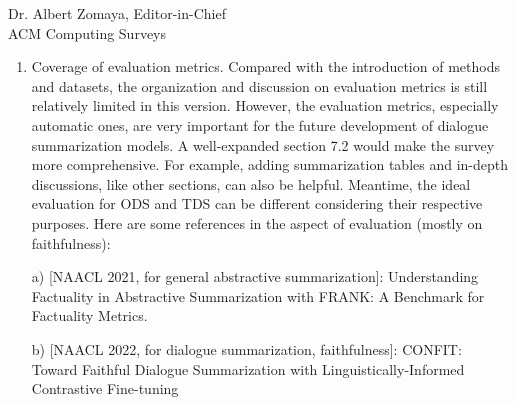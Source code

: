 \documentclass[11pt]{letter} %
\begin{document}
\begin{letter}{
Dr. Albert Zomaya, Editor-in-Chief  \\
ACM Computing Surveys}
\begin{enumerate}
\begin{itemize}
			\item Sec 8.2 Future Directions, Page 30 Line 20: ``We discuss some possible future directions and organize them into three dimensions: task scenarios, approaches and evaluations......Multi-session dialogue summarization is required when conversations occur multiple times among the same group of speakers. The Information mentioned in previous sessions becomes their consensus and may not be explained again in the current session.......Generalizable and non-labored techniques have attracted increasing attention on other dialogue modeling tasks......Compared with traditional dialogue summarization systems, LLM-based methods largely alleviate the tedious human labor and can be more generalizable due to the removal of unintended annotation artifacts. Nevertheless, approaches that are previously applied to small pre-trained language models in this survey may also provide inspirations and be adapted to augment LLMs for better dialogue summarization performance......Factual errors caused by the mismatch between speakers and events are common as a result of complicated discourse relations among utterances in dialogues......With the strong generation ability of current LLMs, there’s also a doubt that whether the previous taxonomy of error types and evaluation metrics is still suitable. In a word, both meta-evaluation benchmarks and evaluation methods call for innovations.''
		
		\end{itemize}
	
	
	\item Coverage of evaluation metrics. Compared with the introduction of methods and datasets, the organization and discussion on evaluation metrics is still relatively limited in this version. However, the evaluation metrics, especially automatic ones, are very important for the future development of dialogue summarization models. A well-expanded section 7.2 would make the survey more comprehensive. For example, adding summarization tables and in-depth discussions, like other sections, can also be helpful. Meantime, the ideal evaluation for ODS and TDS can be different considering their respective purposes. Here are some references in the aspect of evaluation (mostly on faithfulness):
	
	\quad a) [NAACL 2021, for general abstractive summarization]: Understanding Factuality in Abstractive Summarization with FRANK: A Benchmark for Factuality Metrics. 
	
	\quad b) [NAACL 2022, for dialogue summarization, faithfulness]: CONFIT: Toward Faithful Dialogue Summarization with Linguistically-Informed Contrastive Fine-tuning 
	

\end{enumerate}
\end{letter}
\end{document}
